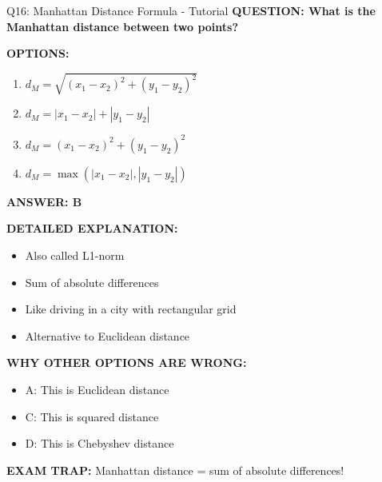 \documentclass[8pt]{beamer}
\begin{document}
	\begin{frame}{Q16: Manhattan Distance Formula - Tutorial}
		\fontsize{6.5}{7.5}\selectfont
		\textbf{QUESTION: What is the Manhattan distance between two points?}
		
		\vspace{0.1cm}
		\textbf{OPTIONS:}
		\begin{enumerate}
			\item $d_M = \sqrt{(x_1 - x_2)^2 + (y_1 - y_2)^2}$
			\item $d_M = |x_1 - x_2| + |y_1 - y_2|$
			\item $d_M = (x_1 - x_2)^2 + (y_1 - y_2)^2$
			\item $d_M = \max(|x_1 - x_2|, |y_1 - y_2|)$
		\end{enumerate}
		
		\vspace{0.1cm}
		\textcolor{myblue}{\textbf{ANSWER: B}}
		
		\vspace{0.1cm}
		\textbf{DETAILED EXPLANATION:}
		\begin{itemize}
			\item Also called L1-norm
			\item Sum of absolute differences
			\item Like driving in a city with rectangular grid
			\item Alternative to Euclidean distance
		\end{itemize}
		
		\vspace{0.1cm}
		\textcolor{myred}{\textbf{WHY OTHER OPTIONS ARE WRONG:}}
		\begin{itemize}
			\item \textcolor{myred}{A:} This is Euclidean distance
			\item \textcolor{myred}{C:} This is squared distance
			\item \textcolor{myred}{D:} This is Chebyshev distance
		\end{itemize}
		
		\textcolor{myred}{\textbf{EXAM TRAP:}} Manhattan distance = \textcolor{myblue}{sum of absolute differences}!
	\end{frame}
	
\end{document}
